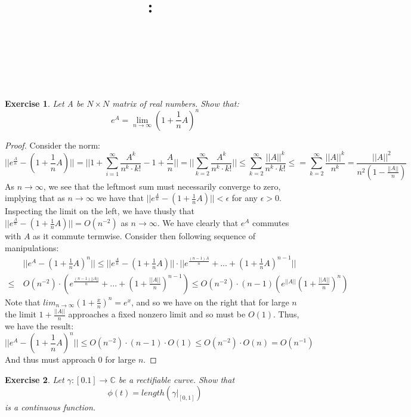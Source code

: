 \documentclass{article}
\title{
    \vspace{2in}
    \textmd{\textbf{\hmwkClass:\ \hmwkTitle}}\\
    \vspace{0.1in}
    \textmd{\hmwkDueDate} \\
    \vspace{0.2in}\large{\textit{\hmwkClassInstructor\  }}
    \vspace{2in}
}
\author{\hmwkAuthorName}
\date{}
\newcommand{\bb}[1]{\mathbb{#1}}
\newtheorem{exercise}{Exercise}
\begin{document}
\maketitle
\newpage
\begin{exercise}
  Let A be $N\times N$ matrix of real numbers. Show that:
  \[
    e^{A} = \lim_{n \to \infty }(1 + \frac{1}{n}A)^{n}
    \]
  \end{exercise}
  \begin{proof}
    Consider the norm:
    \[
      || e^{\frac{A}{n}} - (1+\frac{1}{n}A)|| = || 1 + \sum_{i=1}^{\infty}\frac{A^{k}}{n^{k} \cdot k!} - 1 + \frac{A}{n}|| = || \sum_{k=2}^{\infty}\frac{A^{k}}{n^{k}\cdot k!} || \leq \sum_{k=2}^{\infty}\frac{||A||^{k}}{n^{k}\cdot k!} \leq = \sum_{k=2}^{\infty} \frac{||A||^{k}}{n^{k}} = \frac{||A||^{2}}{n^{2}(1- \frac{||A||}{n})}
    \]
    As $n \to \infty$, we see that the leftmost sum must necessarily converge to zero, implying that as $n \to \infty$ we have that $|| e^{\frac{A}{n}} - (1+\frac{1}{n}A)|| < \epsilon$ for any $\epsilon > 0$. Inspecting the limit on the left, we have thusly that $||e^{\frac{A}{n}}- (1+\frac{1}{n}A)|| = O(n^{-2})$ as $n \to \infty$. We have clearly that $e^{A}$ commutes with $A$ as it commute termwise. Consider then following sequence of manipulations:
    \begin{align*}
      & ||e^{A} - (1+\frac{1}{n}A)^{n}|| \leq ||e^{\frac{A}{n}} - (1+\frac{1}{n}A)|| \cdot ||e^{\frac{(n-1)A}{n}} + ... + (1 + \frac{1}{n}A)^{n-1}||  \\
     \leq \ & O(n^{-2}) \cdot \left(e^{\frac{(n-1)||A||}{n}} + ... + \left(1 + \frac{||A||}{n}\right)^{n-1}\right) \leq O(n^{-2}) \cdot (n-1)\left(e^{||A||}\left(1 + \frac{||A||}{n}\right)^{n}\right)   
    \end{align*}
    Note that $lim_{n \to \infty}(1 + \frac{x}{n})^{n} = e^{x}$, and so we have on the right that for large $n$ the limit $1+ \frac{||A||}{n}$ approaches a fixed nonzero limit and so must be $O(1)$. Thus, we have the result:
    \[
      ||e^{A} - (1+\frac{1}{n}A)^{n}|| \leq O(n^{-2}) \cdot (n-1) \cdot O(1) \leq O(n^{-2}) \cdot O(n) = O(n^{-1})
    \]
    And thus must approach 0 for large $n$. 
  \end{proof}
  \begin{exercise}
    Let $\gamma: [0.1] \to \bb{C}$ be a rectifiable curve. Show that \[\phi(t) = length(\gamma|_{[0,1]}) \] is a continuous function.
  \end{exercise}
\end{document}
